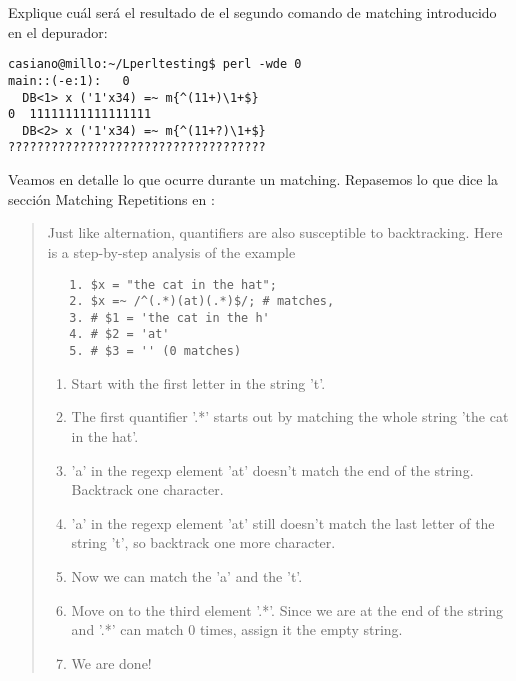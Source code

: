 \begin{exercise}
Explique cuál será el resultado de el segundo comando de matching
introducido en el depurador: 
\begin{verbatim}
casiano@millo:~/Lperltesting$ perl -wde 0
main::(-e:1):   0
  DB<1> x ('1'x34) =~ m{^(11+)\1+$}
0  11111111111111111
  DB<2> x ('1'x34) =~ m{^(11+?)\1+$}
????????????????????????????????????
\end{verbatim}
\end{exercise}

Veamos en detalle lo que ocurre durante un matching.
Repasemos lo que dice la sección Matching Repetitions en :

\begin{it}
\begin{quotation}
Just like alternation, quantifiers are also susceptible to backtracking. Here is a step-by-step analysis of the example

\begin{verbatim}
   1. $x = "the cat in the hat";
   2. $x =~ /^(.*)(at)(.*)$/; # matches,
   3. # $1 = 'the cat in the h'
   4. # $2 = 'at'
   5. # $3 = '' (0 matches)
\end{verbatim}

\begin{enumerate}
    \item

      Start with the first letter in the string 't'.
    \item

      The first quantifier '.*' starts out by matching the whole string 'the cat in the hat'.
    \item

      'a' in the regexp element 'at' doesn't match the end of the string. Backtrack one character.
    \item

      'a' in the regexp element 'at' still doesn't match the last letter of the string 't', so backtrack one more character.
    \item

      Now we can match the 'a' and the 't'.
    \item

      Move on to the third element '.*'. Since we are at the end of the string and '.*' can match 0 times, assign it the empty string.
    \item

      We are done!
\end{enumerate}
\end{quotation}
\end{it}

